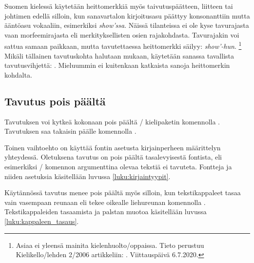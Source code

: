 Suomen kielessä käytetään heittomerkkiä myös taivutuspäätteen, liitteen
tai johtimen edellä silloin, kun sanavartalon kirjoitusasu päättyy
konsonanttiin mutta ääntöasu vokaaliin, esimerkiksi \emph{show'ssa}.
Näissä tilanteissa ei ole kyse tavurajasta vaan morfeemirajasta eli
merkityksellisten osien rajakohdasta. Tavurajakin voi sattua samaan
paikkaan, mutta tavutettaessa heittomerkki säilyy: \emph{show'-hun}.%
\footnote{Asiaa ei yleensä mainita kielenhuolto\-/oppaissa. Tieto
  perustuu Kielikello\-/lehden 2/2006 artikkeliin:
  . Viittauspäivä
  6.7.2020.} Mikäli tällainen tavutuskohta halutaan mukaan, käytetään
sanassa tavallista tavutusvihjettä: \komento{-}.
Mieluummin ei kuitenkaan katkaista sanoja heittomerkin kohdalta.

\subsection{Tavutus pois päältä}

Tavutuksen voi kytkeä kokonaan pois päältä \-/
kielipaketin komennolla . Tavutuksen saa
takaisin päälle komennolla .

Toinen vaihtoehto on käyttää fontin asetusta  kirjainperheen määrittelyn yhteydessä. Oletuksena tavutus on
pois päältä tasalevyisestä fontista, eli esimerkiksi \-/
komennon argumenttina olevaa tekstiä ei tavuteta. Fontteja ja niiden
asetuksia käsitellään luvussa \ref{luku:kirjaintyypit}.

Käytännössä tavutus menee pois päältä myös silloin, kun tekstikappaleet
tasaa vain vasempaan reunaan eli tekee oikealle liehureunan komennolla
. Tekstikappaleiden tasaamista ja palstan muotoa
käsitellään luvussa \ref{luku:kappaleen_tasaus}.
